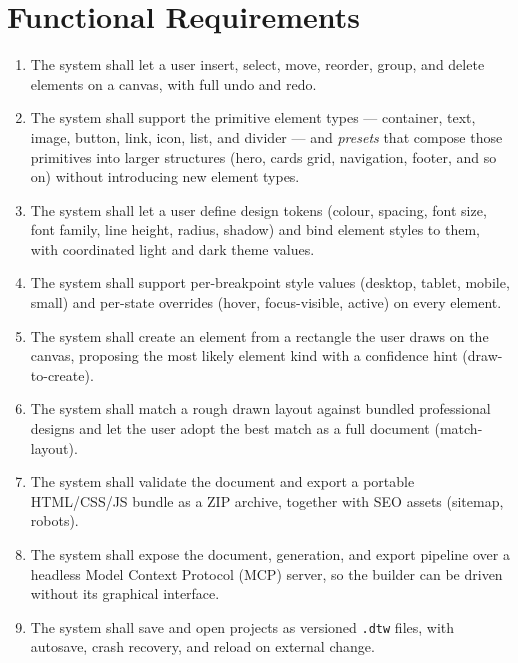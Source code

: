 \section{Functional Requirements}
\begin{enumerate}[label=\textbf{FR\arabic*.}, leftmargin=3.4em]
  \item The system shall let a user insert, select, move, reorder, group, and
        delete elements on a canvas, with full undo and redo.
  \item The system shall support the primitive element types --- container, text,
        image, button, link, icon, list, and divider --- and \emph{presets} that
        compose those primitives into larger structures (hero, cards grid,
        navigation, footer, and so on) without introducing new element types.
  \item The system shall let a user define design tokens (colour, spacing, font
        size, font family, line height, radius, shadow) and bind element styles to
        them, with coordinated light and dark theme values.
  \item The system shall support per-breakpoint style values (desktop, tablet,
        mobile, small) and per-state overrides (hover, focus-visible, active) on
        every element.
  \item The system shall create an element from a rectangle the user draws on the
        canvas, proposing the most likely element kind with a confidence hint
        (draw-to-create).
  \item The system shall match a rough drawn layout against bundled professional
        designs and let the user adopt the best match as a full document
        (match-layout).
  \item The system shall validate the document and export a portable HTML/CSS/JS
        bundle as a ZIP archive, together with SEO assets (sitemap, robots).
  \item The system shall expose the document, generation, and export pipeline over
        a headless Model Context Protocol (MCP) server, so the builder can be
        driven without its graphical interface.
  \item The system shall save and open projects as versioned \texttt{.dtw} files,
        with autosave, crash recovery, and reload on external change.
\end{enumerate}

